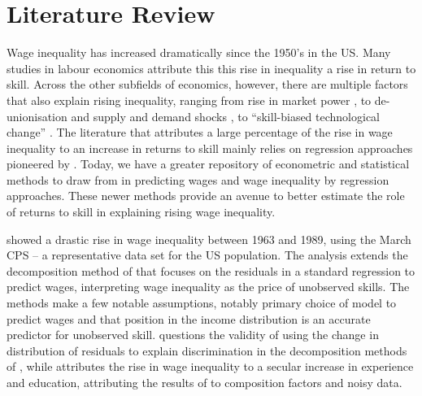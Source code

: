 \documentclass[notitlepage,12pt]{article}
\begin{document}
\section{Literature Review}
Wage inequality has increased dramatically since the 1950's in the US.  Many studies in labour economics attribute this this rise in inequality a rise in return to skill.  Across the other subfields of economics, however, there are multiple factors that also explain rising inequality, ranging from rise in market power \citep{furman2015firm}, to de-unionisation and supply and demand shocks \citep{DML95}, to ``skill-biased technological change'' \citep{acemoglu1998new,acemoglu2002technical}.  The literature that attributes a large percentage of the rise in wage inequality to an increase in returns to skill mainly relies on regression approaches pioneered by \cite{mincer1958investment,mincer1974schooling}.  Today, we have a greater repository of econometric and statistical methods to draw from in predicting wages and wage inequality by regression approaches.  These newer methods provide an avenue to better estimate the role of returns to skill in explaining rising wage inequality.

\cite{juhn1993wage} showed a drastic rise in wage inequality between 1963 and 1989, using the March CPS -- a representative data set for the US population.  The analysis extends the decomposition method of \cite{jmp2011} that focuses on the residuals in a standard regression to predict wages, interpreting wage inequality as the price of unobserved skills.  The methods make a few notable assumptions, notably primary choice of model to predict wages and that position in the income distribution is an accurate predictor for unobserved skill.  \cite{yun2009wage} questions the validity of using the change in distribution of residuals to explain discrimination in the decomposition methods of \cite{jmp2011,juhn1993wage}, while \cite{lemieux2006increasing} attributes the rise in wage inequality to a secular increase in experience and education, attributing the results of \cite{juhn1993wage} to composition factors and noisy data.
\end{document}

